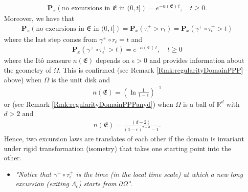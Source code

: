 \documentclass[11pt,a4paper]{article}
\begin{document}
{\begin{align*}
\mathbf{P}_x(\textrm{no excursions in $\mathfrak{E}$ in $(0, t]$} ) = e^{-n(\mathfrak{E})\, t}, \quad t\geq 0.
\end{align*}
Moreover, we have that
\begin{align*}
\mathbf{P}_x(\textrm{no excursions in $\mathfrak{E}$ in $(0, t]$} ) = \mathbf{P}_x(\tau^+_\epsilon > r_t) =  \mathbf{P}_x(\gamma^+ \circ \tau^+_\epsilon > t)
\end{align*}
where the last step comes from $\gamma^+ \circ r_t =t$ and 
\begin{align*}
\mathbf{P}_x(\gamma^+ \circ \tau^+_\epsilon > t) = e^{-n(\mathfrak{E})\, t}, \quad t\geq 0
\end{align*}
where the It\^{o} measure $n(\mathfrak{E})$ depends on $\epsilon>0$ and provides information about the geometry of $\Omega$. This is confirmed (see Remark \ref{Rmk:regularityDomainPPP} above) when $\Omega$ is the unit disk and 
\begin{align*}
n(\mathfrak{E}) = \left( \ln \frac{1}{1-\epsilon} \right)^{-1}
\end{align*}
or (see Remark \ref{Rmk:regularityDomainPPPanyd}) when $\Omega$ is a ball of $\mathbb{R}^d$ with $d>2$ and
\begin{align*}
n(\mathfrak{E}) = \frac{(d-2)}{(1-\epsilon)^{2-d} - 1}.
\end{align*}
Hence, two excursion laws are translates of each other if the domain is invariant under rigid transformation (isometry) that takes one starting point into the other.
\begin{itemize}
\item[] \begin{minipage}{0.85\textwidth}
{\it "Notice that $\gamma^+ \circ \tau^+_\epsilon$ is the time (in the local time scale) at which a new long excursion (exiting $\Lambda_\epsilon$) starts from $\partial \Omega$".}
\end{minipage}
\end{itemize}

}
\end{document}

